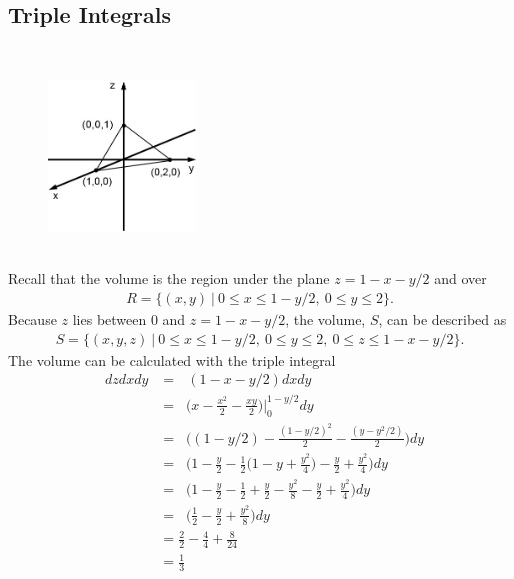 \subsection{Triple Integrals}

\BEN
\item %
 \\
\begin{figure}[h]
  \vspace{-1pt}
  \begin{center}
    \includegraphics[width=0.35\textwidth]{ImgTetExample.jpg}
  \end{center}
\end{figure}\\
Recall that the volume is the region under the plane $z = 1 - x - y/2$ and over  
\begin{align*}
  R = \{ (x,y) \ | \ 0 \le x \le 1- y/2, \ 0 \le y \le 2 \}.
\end{align*}
Because $z$ lies between 0 and $z = 1 - x - y/2$, the volume, $S$, can be described as
\begin{align*}
  S = \{ (x,y,z) \ | \ 0 \le x \le 1- y/2, \ 0 \le y \le 2, \ 0 \le z \le 1 - x - y/2 \}.
\end{align*}
The volume can be calculated with the triple integral
\begin{align*}
  \mathop{\int_{0}^{2} \! \int_0^{1-y/2} \int_0^{1-x-y/2} }dzdxdy
  &= \mathop{\int_{0}^{2} \! \int_0^{1-y/2}  } ( 1-x-y/2) dxdy\\
  &= \mathop{\int_{0}^{2}  } \Big( x-\frac{x^2}{2}-\frac{xy}{2}\Big)\Big|_0^{1-y/2} dy \\
  &= \mathop{\int_{0}^{2}  } \Big( (1-y/2)-\frac{(1-y/2)^2}{2}-\frac{(y-y^2/2)}{2}\Big) dy \\
  &= \mathop{\int_{0}^{2}  } \Bigg( 1 - \frac{y}{2}-\frac{1}{2}\Big(1 - y + \frac{y^2}{4}\Big)-\frac{y}{2}+\frac{y^2}{4}\Bigg) dy \\
  &= \mathop{\int_{0}^{2}  } \Bigg( 1 - \frac{y}{2} - \frac{1}{2} + \frac{y}{2} - \frac{y^2}{8} -\frac{y}{2}+\frac{y^2}{4}\Bigg) dy \\
  &= \mathop{\int_{0}^{2}  } \Big( \frac{1}{2} - \frac{y}{2} + \frac{y^2}{8} \Big) dy \\
  &= \frac{2}{2} - \frac{4}{4}  + \frac{8}{24} \\
  &= \frac{1}{3}
\end{align*} 
